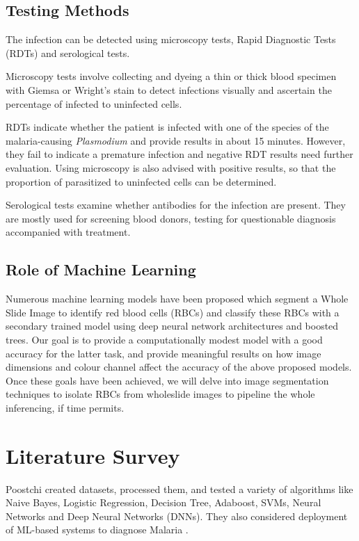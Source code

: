 \documentclass[10pt,twocolumn,letterpaper]{article}
\begin{document}
\subsection{Testing Methods}
The infection can be detected using microscopy tests, Rapid Diagnostic Tests (RDTs) and serological tests.\cite{cdcmalaria}

Microscopy tests involve collecting and dyeing a thin or thick blood specimen with Giemsa or Wright's stain to detect infections visually and ascertain the percentage of infected to uninfected cells.

RDTs indicate whether the patient is infected with one of the species of the malaria-causing \textit{Plasmodium} and provide results in about 15 minutes. However, they fail to indicate a premature infection and negative RDT results need further evaluation. Using microscopy is also advised with positive results, so that the proportion of parasitized to uninfected cells can be determined.

Serological tests examine whether antibodies for the infection are present. They are mostly used for screening blood donors, testing for questionable diagnosis accompanied with treatment.

\subsection{Role of Machine Learning}
Numerous machine learning models have been proposed which segment a Whole Slide Image to identify red blood cells (RBCs) and classify these RBCs with a secondary trained model using deep neural network architectures and boosted trees. Our goal is to provide a computationally modest model with a good accuracy for the latter task, and provide meaningful results on how image dimensions and colour channel affect the accuracy of the above proposed models. Once these goals have been achieved, we will delve into image segmentation techniques to isolate RBCs from wholeslide images to pipeline the whole inferencing, if time permits.

\section{Literature Survey}
%
Poostchi \etal created datasets, processed them, and tested a variety of algorithms like Naive Bayes, Logistic Regression, Decision Tree, Adaboost, SVMs, Neural Networks and Deep Neural Networks (DNNs). They also considered deployment of ML-based systems to diagnose Malaria \cite{POOSTCHI201836}.
\end{document}
